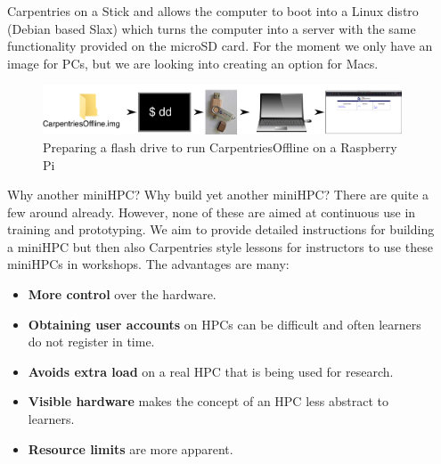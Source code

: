 \documentclass[final,20pt]{beamer}
\newlength{\sepwidth}
\newlength{\colwidth}
\newcommand{\separatorcolumn}{\begin{column}{\sepwidth}\end{column}}
\begin{document}
\begin{frame}[t]
\begin{columns}[t]
\begin{column}{\colwidth}
\begin{alertblock}{Carpentries on a Stick}
					and allows the computer to boot into a Linux distro (Debian based Slax) which turns the computer into a server with the same functionality 
					provided on the microSD card. For the moment we only have an image for PCs, but we are looking into creating an option for Macs.
					\break
					\begin{center}
						\begin{figure}
							\includegraphics[width=0.9\columnwidth]{svg/flashdrive.png}
							\caption{Preparing a flash drive to run CarpentriesOffline on a Raspberry Pi}
						\end{figure}
					\end{center}
				\end{alertblock}
				\begin{alertblock}{Why another miniHPC?}
					Why build yet another miniHPC? There are quite a few around already. However, none of these 
					are aimed at continuous use in training and prototyping. We aim to provide detailed instructions
					for building a miniHPC but then also Carpentries style lessons for instructors to use these 
					miniHPCs in workshops. The advantages are many:
						\break
						\begin{itemize}
						\item \textbf{More control} over the hardware.
						\item \textbf{Obtaining user accounts} on HPCs can be difficult and often
						learners do not register in time.
						\item \textbf{Avoids extra load} on a real HPC that is being used for research.
						\item \textbf{Visible hardware} makes the concept of an HPC less abstract to learners.
						\item \textbf{Resource limits} are more apparent. 
						\break

						\break

					\end{itemize}
				\end{alertblock}		
			\end{column}
			\separatorcolumn
		\end{columns}
	

\end{frame}
\end{document}
